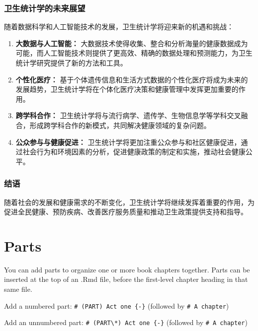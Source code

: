 \documentclass[
]{book}
\theoremstyle{definition}
\theoremstyle{definition}
\theoremstyle{definition}
\theoremstyle{definition}
\theoremstyle{remark}
\begin{document}
\hypertarget{ux536bux751fux7edfux8ba1ux5b66ux7684ux672aux6765ux5c55ux671b}{%
\subsection{卫生统计学的未来展望}\label{ux536bux751fux7edfux8ba1ux5b66ux7684ux672aux6765ux5c55ux671b}}

随着数据科学和人工智能技术的发展，卫生统计学将迎来新的机遇和挑战：

\begin{enumerate}
\def\labelenumi{\arabic{enumi}.}
\item
  \textbf{大数据与人工智能：} 大数据技术使得收集、整合和分析海量的健康数据成为可能，而人工智能技术则提供了更高效、精确的数据处理和预测能力，为卫生统计学研究提供了新的方法和工具。
\item
  \textbf{个性化医疗：} 基于个体遗传信息和生活方式数据的个性化医疗将成为未来的发展趋势，卫生统计学将在个体化医疗决策和健康管理中发挥更加重要的作用。
\item
  \textbf{跨学科合作：} 卫生统计学将与流行病学、遗传学、生物信息学等学科交叉融合，形成跨学科合作的新模式，共同解决健康领域的复杂问题。
\item
  \textbf{公众参与与健康促进：} 卫生统计学将更加注重公众参与和社区健康促进，通过社会行为和环境因素的分析，促进健康政策的制定和实施，推动社会健康公平。
\end{enumerate}

\hypertarget{ux7ed3ux8bed}{%
\subsection{结语}\label{ux7ed3ux8bed}}

随着社会的发展和健康需求的不断变化，卫生统计学将继续发挥着重要的作用，为促进全民健康、预防疾病、改善医疗服务质量和推动卫生政策提供支持和指导。

\hypertarget{parts}{%
\chapter{Parts}\label{parts}}

You can add parts to organize one or more book chapters together. Parts can be inserted at the top of an .Rmd file, before the first-level chapter heading in that same file.

Add a numbered part: \texttt{\#\ (PART)\ Act\ one\ \{-\}} (followed by \texttt{\#\ A\ chapter})

Add an unnumbered part: \texttt{\#\ (PART\textbackslash{}*)\ Act\ one\ \{-\}} (followed by \texttt{\#\ A\ chapter})
\end{document}
